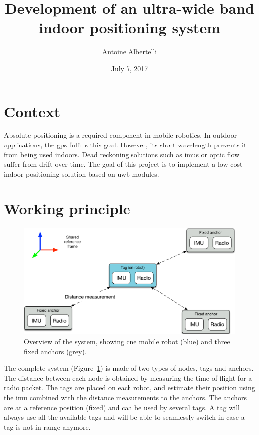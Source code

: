 \documentclass[a4paper,twocolumn]{article}
\date{July 7, 2017}
\title{Development of an ultra-wide band indoor positioning system}
\author{Antoine Albertelli}
\begin{document}
\maketitle
{}

\section{Context}

Absolute positioning is a required component in mobile robotics.
In outdoor applications, the \gls{gps} fulfills this goal.
However, its short wavelength prevents it from being used indoors.
Dead reckoning solutions such as \glspl{imu} or optic flow suffer from drift over time.
The goal of this project is to implement a low-cost indoor positioning solution based on \gls{uwb} modules.

\section{Working principle}

\begin{figure}[h!]
    \centering
    \includegraphics[width=\textwidth]{figures/system.pdf}
    \caption{Overview of the system, showing one mobile robot (blue) and three fixed anchors (grey).}
    \label{fig:system}
\end{figure}

The complete system (Figure~\ref{fig:system}) is made of two types of nodes, tags and anchors.
The distance between each node is obtained by measuring the time of flight for a radio packet.
The tags are placed on each robot, and estimate their position using the \gls{imu} combined with the distance measurements to the anchors.
The anchors are at a reference position (fixed) and can be used by several tags.
A tag will always use all the available tags and will be able to seamlessly switch in case a tag is not in range anymore.
\end{document}
